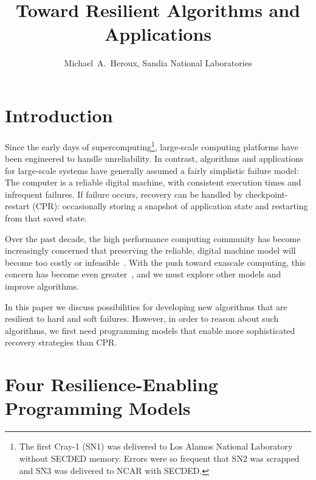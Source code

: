 \documentclass[10pt, twocolumn]{IEEEtran}
\begin{document}
\title{Toward Resilient Algorithms and Applications}

\author{
Michael~A.~Heroux,  Sandia National Laboratories\\
}


\date{} 


\maketitle

\section{Introduction}

Since the early days of supercomputing\footnote{The first Cray-1 (SN1) was delivered to Los Alamos National Laboratory without SECDED memory.  Errors were so frequent that SN2 was scrapped and SN3 was delivered to NCAR with SECDED.}, large-scale computing platforms have been engineered to handle unreliability.  In contrast, algorithms and applications for large-scale systems have generally assumed a fairly simplistic failure model:  The computer is a reliable digital machine, with consistent execution times and infrequent failures.  If failure occurs, recovery can be handled by checkpoint-restart (CPR): occasionally storing a snapshot of application state and restarting from that saved state.

Over the past decade, the high performance computing community has become increasingly concerned that preserving the reliable, digital machine model will become too costly or infeasible~\cite{Miskov-Zivanov:2007:SER:1266366.1266680,Karnik:2004:CSE:1032295.1032595}.  With the push toward exascale computing, this concern has become even greater~\cite{InterAgencyResilienceWorkshop2012}, and we must explore other models and improve algorithms.

In this paper we discuss possibilities for developing new algorithms that are resilient to hard and soft failures.  However, in order to reason about such algorithms, we first need programming models that enable more sophisticated recovery strategies than CPR. 

\section{Four Resilience-Enabling Programming Models}
\end{document}
